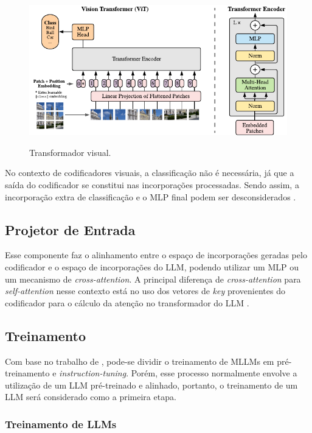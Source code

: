 \begin{figure}[ht]
    \centering
    \caption{\small Transformador visual.}
    \includegraphics[width=0.8\columnwidth,keepaspectratio]{images/vision_transformer.pdf}
    \label{fig:vision_transformer}
\end{figure}

No contexto de codificadores visuais, a classificação não é necessária, já que a saída do codificador se constitui nas
incorporações processadas. Sendo assim, a incorporação extra de classificação e o \ac{MLP} final podem ser
desconsiderados \cite{dubey2024llama}.

\subsection{Projetor de Entrada}

Esse componente faz o alinhamento entre o espaço de incorporações geradas pelo codificador e o espaço de incorporações
do \ac{LLM}, podendo utilizar um \ac{MLP} ou um mecanismo de \textit{cross-attention}. A principal diferença de
\textit{cross-attention} para \textit{self-attention} nesse contexto está no uso dos vetores de \textit{key}
provenientes do codificador para o cálculo da atenção no transformador do \ac{LLM} \cite{mllm_survey_2024}.

\subsection{Treinamento}

Com base no trabalho de \textcite{mllm_survey_2024}, pode-se dividir o treinamento de \acp{MLLM} em pré-treinamento e
\textit{instruction-tuning}. Porém, esse processo normalmente envolve a utilização de um \ac{LLM} pré-treinado e
alinhado, portanto, o treinamento de um \ac{LLM} será considerado como a primeira etapa.

\subsubsection{Treinamento de LLMs}

